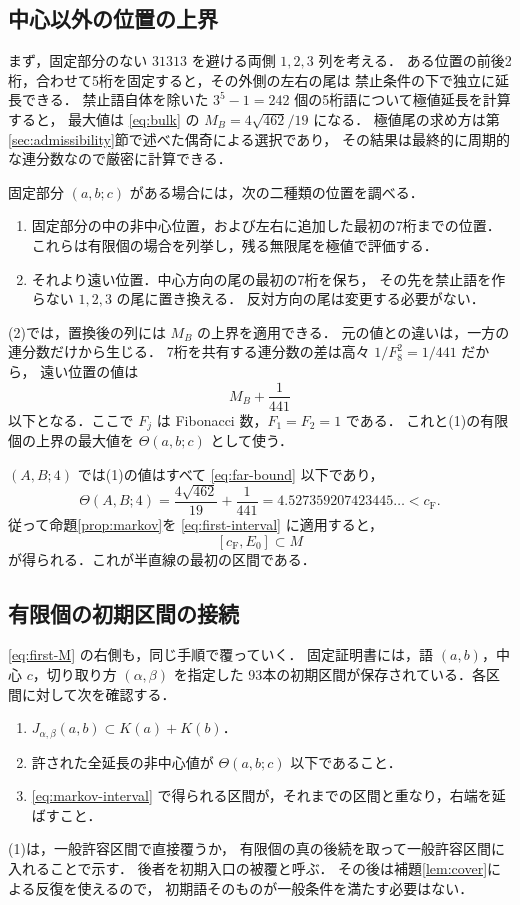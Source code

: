 \documentclass[11pt,a4paper]{article}
\theoremstyle{definition}
\newcommand{\CF}{c_{\mathrm F}}
\begin{document}
\subsection{中心以外の位置の上界}\label{sec:noncentral}
まず，固定部分のない $31313$ を避ける両側 $1,2,3$ 列を考える．
ある位置の前後2桁，合わせて5桁を固定すると，その外側の左右の尾は
禁止条件の下で独立に延長できる．
禁止語自体を除いた $3^5-1=242$ 個の5桁語について極値延長を計算すると，
最大値は \eqref{eq:bulk} の $M_B=4\sqrt{462}/19$ になる．
極値尾の求め方は第\ref{sec:admissibility}節で述べた偶奇による選択であり，
その結果は最終的に周期的な連分数なので厳密に計算できる．

固定部分 $(a,b;c)$ がある場合には，次の二種類の位置を調べる．
\begin{enumerate}
\item 固定部分の中の非中心位置，および左右に追加した最初の7桁までの位置．
これらは有限個の場合を列挙し，残る無限尾を極値で評価する．
\item それより遠い位置．中心方向の尾の最初の7桁を保ち，
その先を禁止語を作らない $1,2,3$ の尾に置き換える．
反対方向の尾は変更する必要がない．
\end{enumerate}
(2)では，置換後の列には $M_B$ の上界を適用できる．
元の値との違いは，一方の連分数だけから生じる．
7桁を共有する連分数の差は高々 $1/F_8^2=1/441$ だから，
遠い位置の値は
\begin{equation}\label{eq:far-bound}
 M_B+\frac1{441}
\end{equation}
以下となる．ここで $F_j$ は Fibonacci 数，$F_1=F_2=1$ である．
これと(1)の有限個の上界の最大値を $\Theta(a,b;c)$ として使う．

$(A,B;4)$ では(1)の値はすべて \eqref{eq:far-bound} 以下であり，
\[
 \Theta(A,B;4)=\frac{4\sqrt{462}}{19}+\frac1{441}
     =4.527359207423445\ldots<\CF.
\]
従って命題\ref{prop:markov}を \eqref{eq:first-interval} に適用すると，
\begin{equation}\label{eq:first-M}
 [\CF,E_0]\subset M
\end{equation}
が得られる．これが半直線の最初の区間である．

\subsection{有限個の初期区間の接続}
\eqref{eq:first-M} の右側も，同じ手順で覆っていく．
固定証明書には，語 $(a,b)$，中心 $c$，切り取り方 $(\alpha,\beta)$ を指定した
93本の初期区間が保存されている．各区間に対して次を確認する．
\begin{enumerate}
\item $J_{\alpha,\beta}(a,b)\subset K(a)+K(b)$．
\item 許された全延長の非中心値が $\Theta(a,b;c)$ 以下であること．
\item \eqref{eq:markov-interval} で得られる区間が，それまでの区間と重なり，右端を延ばすこと．
\end{enumerate}
(1)は，一般許容区間で直接覆うか，
有限個の真の後続を取って一般許容区間に入れることで示す．
後者を初期入口の被覆と呼ぶ．
その後は補題\ref{lem:cover}による反復を使えるので，
初期語そのものが一般条件を満たす必要はない．
\end{document}
